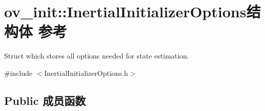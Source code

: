 \hypertarget{structov__init_1_1InertialInitializerOptions}{}\section{ov\+\_\+init\+:\+:Inertial\+Initializer\+Options结构体 参考}
\label{structov__init_1_1InertialInitializerOptions}


Struct which stores all options needed for state estimation.  




{\ttfamily \#include $<$Inertial\+Initializer\+Options.\+h$>$}

\subsection*{Public 成员函数}
